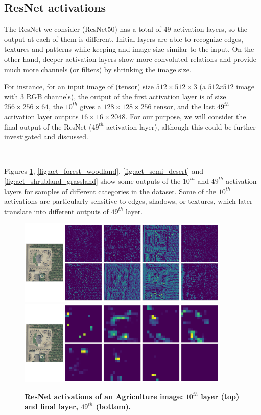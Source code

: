 \subsection{ResNet activations}

The ResNet we consider (ResNet50) has a total of $49$ activation layers, so the output at each of them is different. Initial layers are able to recognize edges, textures and patterns while keeping and image size similar to the input. On the other hand, deeper activation layers show more convoluted relations and provide much more channels (or filters) by shrinking the image size.

For instance, for an input image of (tensor) size $512 \times 512 \times 3$ (a $512x512$ image with $3$ RGB channels), the output of the first activation layer is of size $256 \times 256 \times 64$, the $10^{th}$ gives a $128 \times 128 \times 256$ tensor, and the last $49^{th}$ activation layer outputs $16 \times 16 \times 2048$. For our purpose, we will consider the final output of the ResNet ($49^{th}$ activation layer), although this could be further investigated and discussed.

\

Figures \ref{fig:act_agriculture}, \ref{fig:act_forest_woodland}, \ref{fig:act_semi_desert} and \ref{fig:act_shrubland_grassland} show some outputs of the $10^{th}$ and $49^{th}$ activation layers for samples of different categories in the dataset. Some of the $10^{th}$ activations are particularly sensitive to edges, shadows, or textures, which later translate into different outputs of $49^{th}$ layer.

\begin{figure}[h!]
	\centering
	\includegraphics[width=0.9\textwidth]{Figures/activations/agriculture_l2_s1_activation_10.png}
	\includegraphics[width=0.9\textwidth]{Figures/activations/agriculture_l2_s1_activation_49.png}
	\captionsetup{width=1\linewidth}
	\caption{\textbf{ResNet activations of an Agriculture image: $10^{th}$ layer (top) and final layer, $49^{th}$ (bottom).}}
	\label{fig:act_agriculture}
\end{figure}

